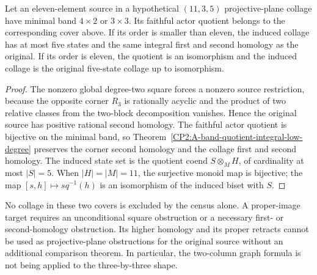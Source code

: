 \begin{corollary}
\label{CP2:A-remaining-faithful-hull-comparison}
Let an eleven-element source in a hypothetical $(11,3,5)$
projective-plane collage have minimal band $4\times2$ or
$3\times3$.  Its faithful actor quotient belongs to the
corresponding cover above.  If its order is smaller than
eleven, the induced collage has at most five states and the
same integral first and second homology as the original.
If its order is eleven, the quotient is an isomorphism and
the induced collage is the original five-state collage up
to isomorphism.
\end{corollary}
\begin{proof}
The nonzero global degree-two square forces a nonzero source
restriction, because the opposite corner $R_3$ is rationally
acyclic and the product of two relative classes from the
two-block decomposition vanishes.  Hence the original
source has positive rational second homology.  The faithful
actor quotient is bijective on the minimal band, so
Theorem~\ref{CP2:A-band-quotient-integral-low-degree} preserves
the corner second homology and the collage first and second
homology.  The induced state set is the quotient coend
$S\otimes_M H$, of cardinality at most $|S|=5$.
When $|H|=|M|=11$, the surjective monoid map is bijective;
the map $[s,h]\mapsto s q^{-1}(h)$ is an isomorphism of the
induced biset with $S$.
\end{proof}

\begin{remark*}
No collage in these two covers is excluded by the census
alone.  A proper-image target requires an unconditional
square obstruction or a necessary first- or second-homology
obstruction.  Its higher homology and its proper retracts
cannot be used as projective-plane obstructions for the
original source without an additional comparison theorem.
In particular, the two-column graph formula is not being
applied to the three-by-three shape.
\end{remark*}
